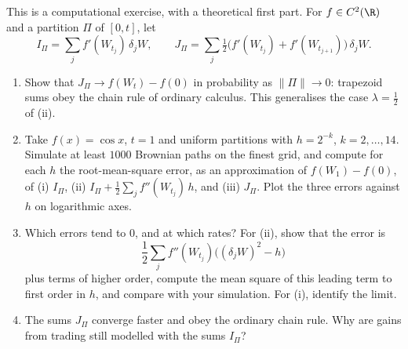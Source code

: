 \begin{exercise}\label{ex:itf-ito-sums}
\medium This is a computational exercise, with a theoretical first part. For $f\in C^2(\R)$ and a
partition $\Pi$ of $[0,t]$, let
\[
  I_\Pi=\sum_jf'(W_{t_j})\,\delta_jW,\qquad
  J_\Pi=\sum_j\tfrac12\big(f'(W_{t_j})+f'(W_{t_{j+1}})\big)\,\delta_jW .
\]
\begin{enumerate}[label=(\alph*)]
  \item Show that $J_\Pi\to f(W_t)-f(0)$ in probability as $\|\Pi\|\to0$: trapezoid sums obey the chain
    rule of ordinary calculus. This generalises the case $\lambda=\frac12$ of
    (ii).
  \item Take $f(x)=\cos x$, $t=1$ and uniform partitions with $h=2^{-k}$, $k=2,\dots,14$. Simulate at least
    $1000$ Brownian paths on the finest grid, and compute for each $h$ the root-mean-square error, as an
    approximation of $f(W_1)-f(0)$, of (i) $I_\Pi$, (ii) $I_\Pi+\frac12\sum_jf''(W_{t_j})\,h$, and
    (iii) $J_\Pi$. Plot the three errors against $h$ on logarithmic axes.
  \item Which errors tend to $0$, and at which rates? For (ii), show that the error is
    \[
      \frac12\sum_jf''(W_{t_j})\big((\delta_jW)^2-h\big)
    \]
    plus terms of higher order, compute the mean square of this leading term to first order in $h$, and
    compare with your simulation. For (i), identify the limit.
  \item The sums $J_\Pi$ converge faster and obey the ordinary chain rule. Why are gains from trading still
    modelled with the sums $I_\Pi$?
\end{enumerate}
\end{exercise}

